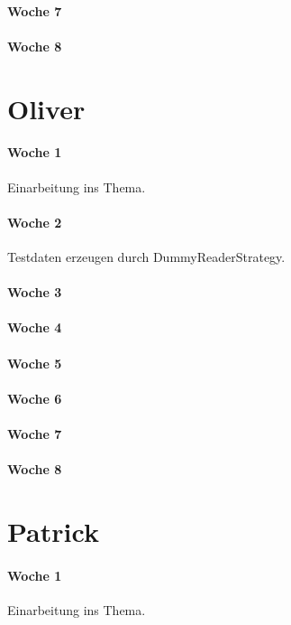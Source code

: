 \paragraph{Woche 7}

\paragraph{Woche 8}

\newpage
\section{Oliver}
\paragraph{Woche 1}
Einarbeitung ins Thema.
\paragraph{Woche 2}
Testdaten erzeugen durch DummyReaderStrategy.
\paragraph{Woche 3}

\paragraph{Woche 4}

\paragraph{Woche 5}

\paragraph{Woche 6}

\paragraph{Woche 7}

\paragraph{Woche 8}

\section{Patrick}
\paragraph{Woche 1}
Einarbeitung ins Thema.
